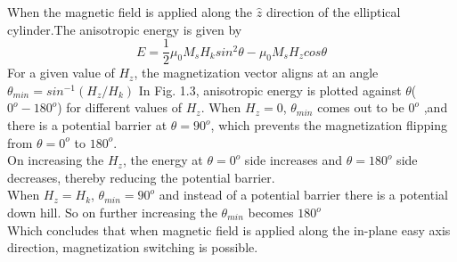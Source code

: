 \documentclass[12pt,a4paper,bold]{thesis}
\theoremstyle{thm}
\theoremstyle{definition}
\begin{document}
When the magnetic field is applied along the $\hat{z}$ direction of the elliptical cylinder.The anisotropic energy is given by 
\[E=\frac{1}{2}\mu_0M_sH_ksin^2\theta - \mu_0M_sH_zcos\theta\]
For a given value of $H_z$, the magnetization vector aligns at an angle $\theta_{min}=sin^{-1}(H_z/H_k)$
In Fig. 1.3, anisotropic energy is plotted against $\theta$($0^o - 180^o$) for different values of $H_z$.
When $H_z=0$, $\theta_{min}$ comes out to be $0^o$ ,and there is a potential barrier at $\theta=90^o$, which prevents the magnetization flipping from $\theta=0^o$ to $180^o$. \\
On increasing the $H_z$, the energy at $\theta=0^o$ side increases and $\theta=180^o$ side decreases, thereby reducing the potential barrier.\\
When $H_z=H_k$, $\theta_{min}=90^o$ and instead of a potential barrier there is a potential down hill. So on further increasing the $\theta_{min}$ becomes $180^o$\\
Which concludes that when magnetic field is applied along the in-plane easy axis direction, magnetization switching is possible.
  
\end{document}

